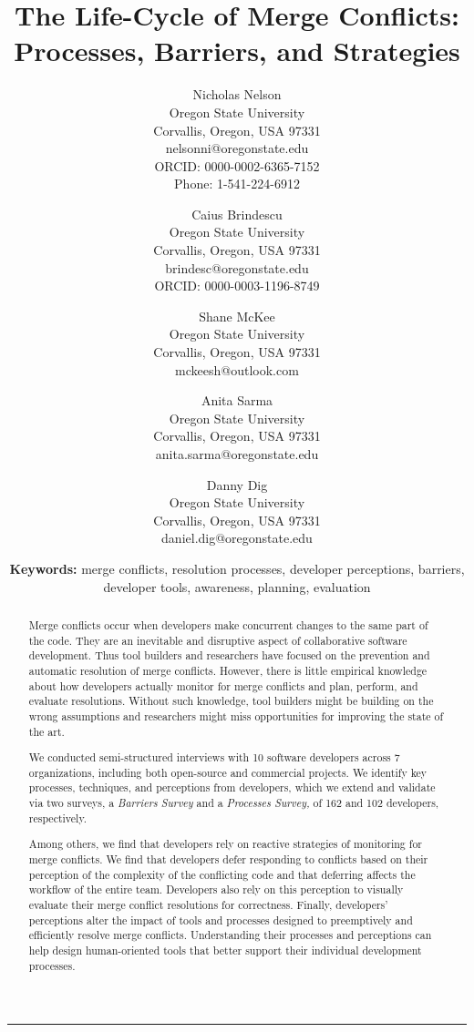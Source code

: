 \documentclass{article}
\title{
\vspace*{-4.2\baselineskip}
{\LARGE \bfseries {The Life-Cycle of Merge Conflicts: Processes, Barriers, and Strategies}}}
\author{\large
Nicholas Nelson\\Oregon State University\\Corvallis, Oregon, USA 97331\\nelsonni@oregonstate.edu\\ORCID: 0000-0002-6365-7152\\Phone: 1-541-224-6912
\and 
Caius Brindescu\\Oregon State University\\Corvallis, Oregon, USA 97331\\brindesc@oregonstate.edu\\ORCID: 0000-0003-1196-8749
\and
Shane McKee\\Oregon State University\\Corvallis, Oregon, USA 97331\\mckeesh@outlook.com
\and
Anita Sarma\\Oregon State University\\Corvallis, Oregon, USA 97331\\anita.sarma@oregonstate.edu
\and
Danny Dig\\Oregon State University\\Corvallis, Oregon, USA 97331\\daniel.dig@oregonstate.edu
}
\date{{\textbf{Keywords: } merge conflicts, resolution processes, developer perceptions, barriers, developer tools, awareness, planning, evaluation}}
\begin{document}
\maketitle

\hrule

\begin{abstract}
Merge conflicts occur when developers make concurrent changes to the same part of the code.
They are an inevitable and disruptive aspect of collaborative software development.
Thus tool builders and researchers have focused on the prevention and automatic resolution of merge conflicts.
However, there is little empirical knowledge about how developers actually monitor for merge conflicts and plan, perform, and evaluate resolutions.
Without such knowledge, tool builders might be building on the wrong assumptions and researchers might miss opportunities for improving the state of the art.

We conducted semi-structured interviews with 10 software developers across 7 organizations, including both open-source and commercial projects.
We identify key processes, techniques, and perceptions from developers, which we extend and validate via two surveys, a \emph{Barriers Survey} and a \emph{Processes Survey,} of 162 and 102 developers, respectively.

Among others, we find that developers rely on reactive strategies of monitoring for merge conflicts.
We find that developers defer responding to conflicts based on their perception of the complexity of the conflicting code and that deferring affects the workflow of the entire team.
Developers also rely on this perception to visually evaluate their merge conflict resolutions for correctness.
Finally, developers' perceptions alter the impact of tools and processes designed to preemptively and efficiently resolve merge conflicts.
Understanding their processes and perceptions can help design human-oriented tools that better support their individual development processes.
\end{abstract}
\vfill
\newpage
\end{document}
